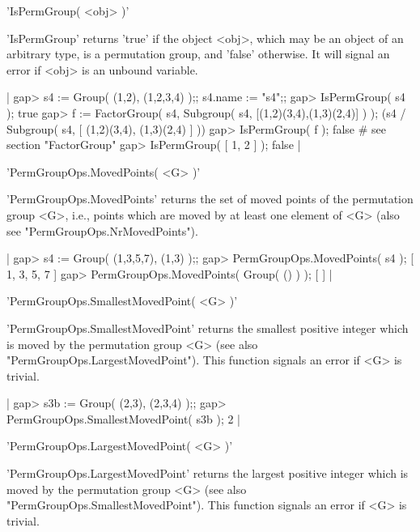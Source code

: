
'IsPermGroup( <obj> )'

'IsPermGroup' returns 'true' if the object  <obj>, which may be an object
of an arbitrary type, is  a permutation group, and 'false' otherwise.  It
will signal an error if <obj> is an unbound variable.

|    gap> s4 := Group( (1,2), (1,2,3,4) );; s4.name := "s4";;
    gap> IsPermGroup( s4 );
    true
    gap> f := FactorGroup( s4, Subgroup( s4, [(1,2)(3,4),(1,3)(2,4)] ) );
    (s4 / Subgroup( s4, [ (1,2)(3,4), (1,3)(2,4) ] ))
    gap> IsPermGroup( f );
    false    # see section "FactorGroup"
    gap> IsPermGroup( [ 1, 2 ] );
    false |


'PermGroupOps.MovedPoints( <G> )'

'PermGroupOps.MovedPoints'  returns  the  set  of  moved  points  of  the
permutation group <G>,  i.e., points  which  are  moved  by at  least one
element of <G> (also see "PermGroupOps.NrMovedPoints").

|    gap> s4 := Group( (1,3,5,7), (1,3) );;
    gap> PermGroupOps.MovedPoints( s4 );
    [ 1, 3, 5, 7 ]
    gap> PermGroupOps.MovedPoints( Group( () ) );
    [  ] |


'PermGroupOps.SmallestMovedPoint( <G> )'

'PermGroupOps.SmallestMovedPoint'  returns the smallest  positive integer
which   is   moved   by    the   permutation   group    <G>   (see   also
"PermGroupOps.LargestMovedPoint").  This function signals an error if <G>
is trivial.

|    gap> s3b := Group( (2,3), (2,3,4) );;
    gap> PermGroupOps.SmallestMovedPoint( s3b );
    2 |


'PermGroupOps.LargestMovedPoint( <G> )'

'PermGroupOps.LargestMovedPoint'  returns  the  largest positive  integer
which    is   moved   by   the   permutation    group   <G>   (see   also
"PermGroupOps.SmallestMovedPoint").  This  function  signals an  error if
<G> is trivial.

